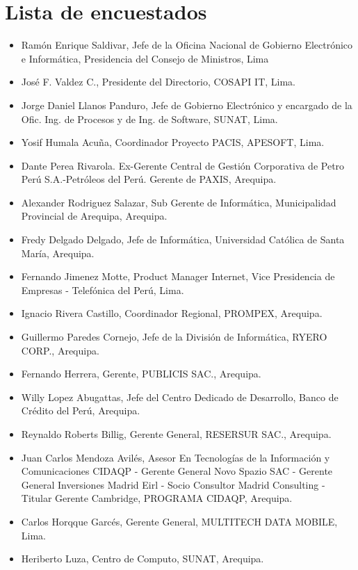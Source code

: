 \section{Lista de encuestados}\label{sec:cs-lista-de-encuestados}

\begin{itemize}
\item Ramón Enrique Saldivar, Jefe de la Oficina Nacional de Gobierno Electrónico e Informática, Presidencia del Consejo de Ministros, Lima
\item José F. Valdez C., Presidente del Directorio, COSAPI IT, Lima.
\item Jorge Daniel Llanos Panduro, Jefe de Gobierno Electrónico y encargado de la Ofic. Ing. de Procesos y de Ing. de Software, SUNAT, Lima.
\item Yosif Humala Acuña, Coordinador Proyecto PACIS, APESOFT, Lima.
\item Dante Perea Rivarola. Ex-Gerente Central de Gestión Corporativa de Petro Perú S.A.-Petróleos del Perú. Gerente de PAXIS, Arequipa.
\item Alexander Rodriguez Salazar, Sub Gerente de Informática, Municipalidad Provincial de Arequipa, Arequipa.
\item Fredy Delgado Delgado, Jefe de Informática, Universidad Católica de Santa María, Arequipa.
\item Fernando Jimenez Motte, Product Manager Internet, Vice Presidencia de Empresas - Telefónica del Perú, Lima.
\item Ignacio Rivera Castillo, Coordinador Regional, PROMPEX, Arequipa.
\item Guillermo Paredes Cornejo, Jefe de la División de Informática, RYERO CORP., Arequipa.
\item Fernando Herrera, Gerente, PUBLICIS SAC., Arequipa.
\item Willy Lopez Abugattas, Jefe del Centro Dedicado de Desarrollo, Banco de Crédito del Perú, Arequipa.
\item Reynaldo Roberts Billig, Gerente General, RESERSUR SAC., Arequipa.
\item Juan Carlos Mendoza Avilés, Asesor En Tecnologías de la Información y Comunicaciones CIDAQP - Gerente General Novo Spazio SAC - Gerente General Inversiones Madrid Eirl - Socio Consultor Madrid Consulting - Titular Gerente Cambridge, PROGRAMA CIDAQP, Arequipa.
\item Carlos Horqque Garcés, Gerente General, MULTITECH DATA MOBILE, Lima.
\item Heriberto Luza, Centro de Computo, SUNAT, Arequipa.

\end{itemize}
